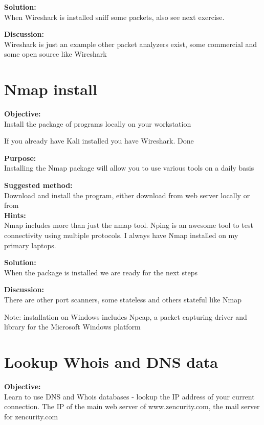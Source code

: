 \documentclass[a4paper,11pt,notitlepage]{report}
\begin{document}
{\bf Solution:}\\
When Wireshark is installed sniff some packets, also see next exercise.

{\bf Discussion:}\\
Wireshark is just an example other packet analyzers exist, some commercial and some open source like Wireshark


\chapter{Nmap install}

\label{ex:nmap-install}



{\bf Objective:}\\
Install the package of programs locally on your workstation

If you already have Kali installed you have Wireshark. Done

{\bf Purpose:}\\
Installing the Nmap package will allow you to use various tools on a daily basis

{\bf Suggested method:}\\
Download and install the program, either download from web server locally or from \\

{\bf Hints:}\\
Nmap includes more than just the nmap tool. Nping is an awesome tool to test connectivity using multiple protocols. I always have Nmap installed on my primary laptops.

{\bf Solution:}\\
When the package is installed we are ready for the next steps

{\bf Discussion:}\\
There are other port scanners, some stateless and others stateful like Nmap

Note: installation on Windows includes Npcap, a packet capturing driver and library for the Microsoft Windows platform

\chapter{Lookup Whois and DNS data}
\label{ex:whois-dns}


{\bf Objective:} \\
Learn to use DNS and Whois databases - lookup the IP address of your current connection. The IP of the main web server of www.zencurity.com, the mail server for zencurity.com
\end{document}
